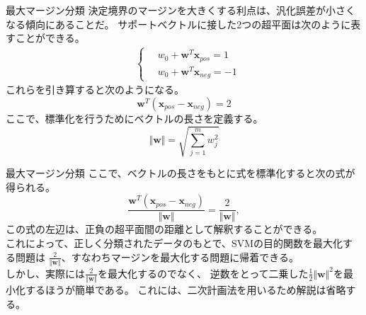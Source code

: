\documentclass[aspectratio=169, dvipdfmx, 11pt]{beamer} %
\begin{document}
\begin{frame}{最大マージン分類}
    決定境界のマージンを大きくする利点は、汎化誤差が小さくなる傾向にあることだ。
    サポートベクトルに接した2つの超平面は次のように表すことができる。
    \begin{equation*}
        \begin{aligned}
            & \left\{ \,
                \begin{aligned}
                    & w_0 + \bm{w}^T \bm{x}_{pos} = 1 \\
                    & w_0 + \bm{w}^T \bm{x}_{neg} = -1
                \end{aligned}
            \right.
        \end{aligned}
    \end{equation*}
    これらを引き算すると次のようになる。
    \begin{equation*}
        \bm{w}^T (\bm{x}_{pos} - \bm{x}_{neg}) = 2
    \end{equation*}
    ここで、標準化を行うためにベクトルの長さを定義する。
    \begin{equation*}
        \Vert\bm{w}\Vert = \sqrt{{\textstyle \sum_{j=1}^{m} w_{j}^{2}}}
    \end{equation*}
\end{frame}

\begin{frame}{最大マージン分類}
    ここで、ベクトルの長さをもとに式を標準化すると次の式が得られる。
    \begin{equation*}
        \frac{\bm{w}^T (\bm{x}_{pos} - \bm{x}_{neg})}{\Vert\bm{w}\Vert} = \frac{2}{\Vert\bm{w}\Vert}, 
    \end{equation*}
    この式の左辺は、正負の超平面間の距離として解釈することができる。\\
    これによって、正しく分類されたデータのもとで、SVMの目的関数を最大化する問題は
    \(\frac{2}{\Vert\bm{w}\Vert}\)、すなわちマージンを最大化する問題に帰着できる。\\
    しかし、実際には\(\frac{2}{\Vert\bm{w}\Vert}\)を最大化するのでなく、
    逆数をとって二乗した\(\frac{1}{2}\Vert\bm{w}\Vert^2\)を最小化するほうが簡単である。
    これには、二次計画法を用いるため解説は省略する。
\end{frame}
\end{document}

